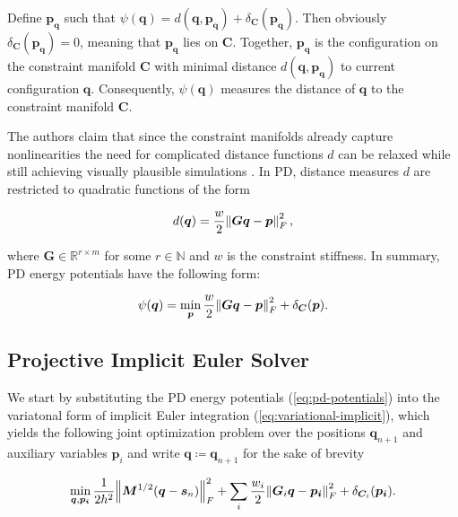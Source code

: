 \noindent Define $\bm{p_{\bm{q}}}$ such that $\psi({\bm{q}}) = d(\bm{q}, \bm{p_{\bm{q}}}) + \delta_{\bm{C}}(\bm{p_{\bm{q}}})$. Then obviously 
$\delta_{\bm{C}}(\bm{p_{\bm{q}}}) = 0$, meaning that $\bm{p_{\bm{q}}}$ lies on $\bm{C}$. Together, $\bm{p_{\bm{q}}}$ is the 
configuration on the constraint manifold $\bm{C}$ with minimal distance $d(\bm{q}, \bm{p_{\bm{q}}})$ to current configuration $\bm{q}$.
Consequently, $\psi(\bm{q})$ measures the distance of $\bm{q}$ to the constraint manifold $\bm{C}$.

The authors claim that since the constraint manifolds already capture nonlinearities the need for complicated distance functions $d$
can be relaxed while still achieving visually plausible simulations \cite{bouaziz2014}. In PD, distance measures $d$ are restricted to 
quadratic functions of the form

\begin{equation}\label{eq:pd-distance-measures}
    d(\bm{q}) = \frac{w}{2} \norm{\bm{Gq} - \bm{p}}^2_F,
\end{equation}

\noindent where $\bm{G} \in \mathbb{R}^{r \times m}$ for some $r \in \mathbb{N}$ and $w$ is the constraint stiffness. In summary, PD 
energy potentials have the following form:

\begin{equation}\label{eq:pd-potentials}
    \psi({\bm{q}}) = \min_{\bm{p}} \frac{w}{2} \norm{\bm{Gq} - \bm{p}}^2_F + \delta_{\bm{C}}(\bm{p}).
\end{equation}

\subsection{Projective Implicit Euler Solver}\label{ss:pd-solver}
We start by substituting the PD energy potentials (\cref{eq:pd-potentials}) into the variatonal form of implicit Euler integration
(\cref{eq:variational-implicit}), which yields the following joint 
optimization problem over the positions $\bm{q}_{n+1}$ and auxiliary variables $\bm{p}_i$ and write $\bm{q} \coloneqq \bm{q}_{n+1}$ 
for the sake of brevity

\begin{equation}\label{eq:pd-minimization}
    \min_{\bm{q}, \bm{p_i}} \frac{1}{2h^2} \norm{\bm{M}^{1/2}(\bm{q} - \bm{s}_n)}^2_F + \sum_i \frac{w_i}{2} \norm{\bm{G}_i\bm{q}
    - \bm{p_i}}^2_F + \delta_{\bm{C}_i}(\bm{p_i}).
\end{equation}

